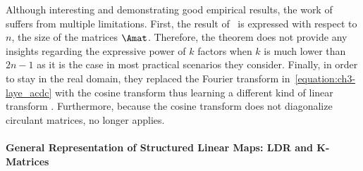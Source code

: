 \noindent
Although interesting and demonstrating good empirical results, the work of~\citet{moczulski2016acdc} suffers from multiple limitations. 
First, the result of~\citet{huhtanen2015factoring} is expressed with respect to $n$, the size of the matrices $\Amat$.
Therefore, the theorem does not provide any insights regarding the expressive power of $k$ factors when $k$ is much lower than $2n-1$ as it is the case in most practical scenarios they consider.
Finally, in order to stay in the real domain, they replaced the Fourier transform in~\cref{equation:ch3-laye_acdc} with the cosine transform thus learning a different kind of linear transform \cite{sanchez1995diagonalizing}.
Furthermore, because the cosine transform does not diagonalize circulant matrices,  no longer applies.

%


\paragraph{General Representation of Structured Linear Maps: LDR and K-Matrices} ~\\

